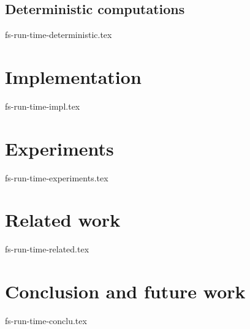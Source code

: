 \documentclass{llncs}
\begin{document}
\subsection {Deterministic computations}
 {fs-run-time-deterministic.tex}

\section {Implementation}
 {fs-run-time-impl.tex}

\section {Experiments}
 {fs-run-time-experiments.tex}

\section {Related work}
 {fs-run-time-related.tex}

\section {Conclusion and future work}
 {fs-run-time-conclu.tex}



\end{document}
